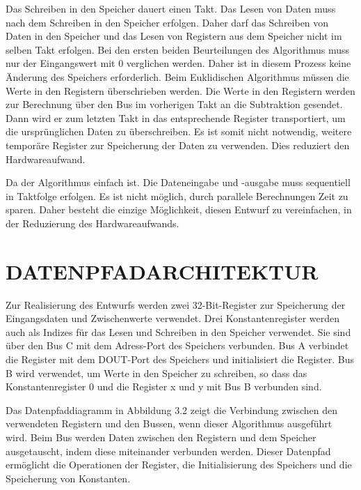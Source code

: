 \vspace{\baselineskip}

\noindent Das Schreiben in den Speicher dauert einen Takt. Das Lesen von Daten muss nach dem Schreiben in den Speicher erfolgen. Daher darf das Schreiben von Daten in den Speicher und das Lesen von Registern aus dem Speicher nicht im selben Takt erfolgen. Bei den ersten beiden Beurteilungen des Algorithmus muss nur der Eingangswert mit 0 verglichen werden. Daher ist in diesem Prozess keine Änderung des Speichers erforderlich. Beim Euklidischen Algorithmus müssen die Werte in den Registern überschrieben werden. Die Werte in den Registern werden zur Berechnung über den Bus im vorherigen Takt an die Subtraktion gesendet. Dann wird er zum letzten Takt in das entsprechende Register transportiert, um die ursprünglichen Daten zu überschreiben. Es ist somit nicht notwendig, weitere temporäre Register zur Speicherung der Daten zu verwenden. Dies reduziert den Hardwareaufwand.

\vspace{\baselineskip}

\noindent Da der Algorithmus einfach ist. Die Dateneingabe und -ausgabe muss sequentiell in Taktfolge erfolgen. Es ist nicht möglich, durch parallele Berechnungen Zeit zu sparen. Daher besteht die einzige Möglichkeit, diesen Entwurf zu vereinfachen, in der Reduzierung des Hardwareaufwands. 

\section{DATENPFADARCHITEKTUR}

Zur Realisierung des Entwurfs werden zwei 32-Bit-Register zur Speicherung der Eingangsdaten und Zwischenwerte verwendet. Drei Konstantenregister werden auch als Indizes für das Lesen und Schreiben in den Speicher verwendet. Sie sind über den Bus C mit dem Adress-Port des Speichers verbunden. Bus A verbindet die Register mit dem DOUT-Port des Speichers und initialisiert die Register. Bus B wird verwendet, um Werte in den Speicher zu schreiben, so dass das Konstantenregister 0 und die Register x und y mit Bus B verbunden sind.

\vspace{\baselineskip}

\noindent Das Datenpfaddiagramm in Abbildung 3.2 zeigt die Verbindung zwischen den verwendeten Registern und den Bussen, wenn dieser Algorithmus ausgeführt wird. Beim Bus werden Daten zwischen den Registern und dem Speicher ausgetauscht, indem diese miteinander verbunden werden. Dieser Datenpfad ermöglicht die Operationen der Register, die Initialisierung des Speichers und die Speicherung von Konstanten.

